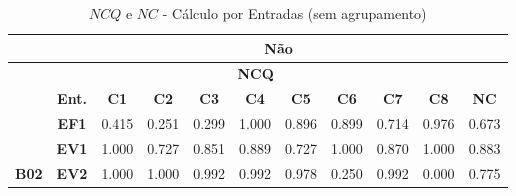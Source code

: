 \begin{table}[htbp]
	\centering
	\caption{$NCQ$ e $NC$ - Cálculo por Entradas (sem agrupamento)}
	\begin{tabular}{|cclllllllll|}
		\hline
		\rowcolor[HTML]{D0CECE} 
		\multicolumn{1}{|c|}{\cellcolor[HTML]{F2F2F2}\textbf{Agrupamento}} & \multicolumn{10}{c|}{Não} \\ \hline
		\rowcolor[HTML]{D0CECE} 
		\multicolumn{1}{|c|}{\cellcolor[HTML]{D0CECE}} & \multicolumn{9}{c|}{\cellcolor[HTML]{D0CECE}\textbf{NCQ}} & \multicolumn{1}{c|}{\cellcolor[HTML]{D0CECE}} \\ \cline{2-10}
		\rowcolor[HTML]{D0CECE} 
		\multicolumn{1}{|c|}{\multirow{-2}{*}{\cellcolor[HTML]{D0CECE}\textbf{Participante}}} & \multicolumn{1}{c|}{\cellcolor[HTML]{D0CECE}\textbf{Ent.}} & \multicolumn{1}{c|}{\cellcolor[HTML]{D0CECE}\textbf{C1}} & \multicolumn{1}{c|}{\cellcolor[HTML]{D0CECE}\textbf{C2}} & \multicolumn{1}{c|}{\cellcolor[HTML]{D0CECE}\textbf{C3}} & \multicolumn{1}{c|}{\cellcolor[HTML]{D0CECE}\textbf{C4}} & \multicolumn{1}{c|}{\cellcolor[HTML]{D0CECE}\textbf{C5}} & \multicolumn{1}{c|}{\cellcolor[HTML]{D0CECE}\textbf{C6}} & \multicolumn{1}{c|}{\cellcolor[HTML]{D0CECE}\textbf{C7}} & \multicolumn{1}{c|}{\cellcolor[HTML]{D0CECE}\textbf{C8}} & \multicolumn{1}{c|}{\multirow{-2}{*}{\cellcolor[HTML]{D0CECE}\textbf{NC}}} \\ \hline
		\multicolumn{1}{|c|}{\cellcolor[HTML]{F2F2F2}} & \multicolumn{1}{c|}{\textbf{EF1}} & \multicolumn{1}{l|}{0.415} & \multicolumn{1}{l|}{0.251} & \multicolumn{1}{l|}{0.299} & \multicolumn{1}{l|}{1.000} & \multicolumn{1}{l|}{0.896} & \multicolumn{1}{l|}{0.899} & \multicolumn{1}{l|}{0.714} & \multicolumn{1}{l|}{0.976} & 0.673 \\ \cline{2-11} 
		\rowcolor[HTML]{F2F2F2} 
		\multicolumn{1}{|c|}{\cellcolor[HTML]{F2F2F2}} & \multicolumn{1}{c|}{\cellcolor[HTML]{F2F2F2}\textbf{EV1}} & \multicolumn{1}{l|}{\cellcolor[HTML]{F2F2F2}1.000} & \multicolumn{1}{l|}{\cellcolor[HTML]{F2F2F2}0.727} & \multicolumn{1}{l|}{\cellcolor[HTML]{F2F2F2}0.851} & \multicolumn{1}{l|}{\cellcolor[HTML]{F2F2F2}0.889} & \multicolumn{1}{l|}{\cellcolor[HTML]{F2F2F2}0.727} & \multicolumn{1}{l|}{\cellcolor[HTML]{F2F2F2}1.000} & \multicolumn{1}{l|}{\cellcolor[HTML]{F2F2F2}0.870} & \multicolumn{1}{l|}{\cellcolor[HTML]{F2F2F2}1.000} & 0.883 \\ \cline{2-11} 
		\multicolumn{1}{|c|}{\multirow{-3}{*}{\cellcolor[HTML]{F2F2F2}\textbf{B02}}} & \multicolumn{1}{c|}{\textbf{EV2}} & \multicolumn{1}{l|}{1.000} & \multicolumn{1}{l|}{1.000} & \multicolumn{1}{l|}{0.992} & \multicolumn{1}{l|}{0.992} & \multicolumn{1}{l|}{0.978} & \multicolumn{1}{l|}{0.250} & \multicolumn{1}{l|}{0.992} & \multicolumn{1}{l|}{0.000} & 0.775 \\ \hline

\end{tabular}
\end{table}

